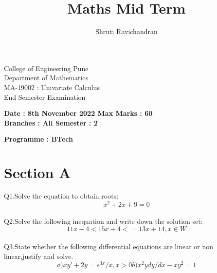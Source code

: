\documentclass[12pt]{article}
\begin{document}
	\title{Maths Mid Term}
	\author{Shruti Ravichandran}
	\maketitle
	\newpage
	\tableofcontents
	\newpage
	{ \begin{center}
			College of Engineering Pune \\Department of Mathematics \\MA-19002 : Univariate Calculus \\End Semester Examination
		\end{center}
	}\raggedleft
	{\bf Date : 8th November 2022      \hspace*{\fill}            Max Marks : 60}
	\\{\bf Branches : All        \hspace*{\fill}                    Semester : 2}	       
	\\\raggedright{\bf Programme : BTech}   
	
	\raggedright\section*{Section A}
	Q1.Solve the equation to obtain roots:
	\begin{equation*}
		x^2+2x+9=0
	\end{equation*}
	\\
	Q2.Solve the following inequation and write down the solution set:
	\begin{equation*}
		11x-4<15x+4<=13x+14,x\in W
	\end{equation*}
	\\
	Q3.State whether the following differential equations are linear or non linear,justify and solve.
	\begin{equation*}
		a)xy'+2y=e^{3x}/x,x>0 
		b)x^2ydy/dx-xy^2=1 
	\end{equation*}
	\\
\end{document}
